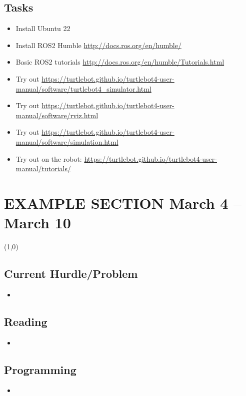 \documentclass{article}
\begin{document}
\subsection{Tasks}
\begin{itemize}
    \item Install Ubuntu 22
    \item Install ROS2 Humble \url{http://docs.ros.org/en/humble/}
    \item Basic ROS2 tutorials \url{http://docs.ros.org/en/humble/Tutorials.html}
    \item Try out \url{https://turtlebot.github.io/turtlebot4-user-manual/software/turtlebot4_simulator.html}
    \item Try out \url{https://turtlebot.github.io/turtlebot4-user-manual/software/rviz.html}
    \item Try out \url{https://turtlebot.github.io/turtlebot4-user-manual/software/simulation.html}
    \item Try out on the robot: \url{https://turtlebot.github.io/turtlebot4-user-manual/tutorials/}
\end{itemize}

\newpage


\iffalse
\section{EXAMPLE SECTION March 4 -- March 10}
\line(1,0){\linewidth}

\subsection{Current Hurdle/Problem}
\begin{itemize}
\item 
\end{itemize}
\subsection{Reading}
\begin{itemize}
\item 
\end{itemize}

\subsection{Programming}
\begin{itemize}
\item 
\end{itemize}
\end{document}
